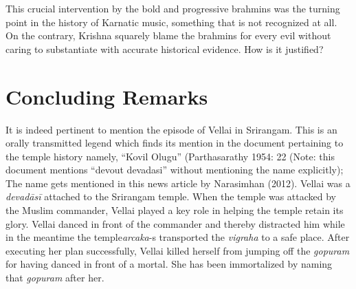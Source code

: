 This crucial intervention by the bold and progressive brahmins was the turning point in the history of Karnatic music, something that is not recognized at all. On the contrary, Krishna squarely blame the brahmins for every evil without caring to substantiate with accurate historical evidence. How is it justified?

\vspace{-.3cm}

\section*{Concluding Remarks}

\vspace{-.2cm}

It is indeed pertinent to mention the episode of Vellai in Srirangam. This is an orally transmitted legend which finds its mention in the document pertaining to the temple history namely, “Kovil Olugu” (Parthasarathy 1954: 22 (Note: this document mentions “devout devadasi” without mentioning the name explicitly); The name gets mentioned in this news article by Narasimhan (2012). Vellai was a \textit{devadāsī} attached to the Srirangam temple. When the temple was attacked by the Muslim commander, Vellai played a key role in helping the temple retain its glory. Vellai danced in front of the commander and thereby distracted him while in the meantime the temple\break \textit{arcaka}-s transported the \textit{vigraha} to a safe place. After executing her plan successfully, Vellai killed herself from jumping off the \textit{gopuram} for having danced in front of a mortal. She has been immortalized by naming that \textit{gopuram} after her.

